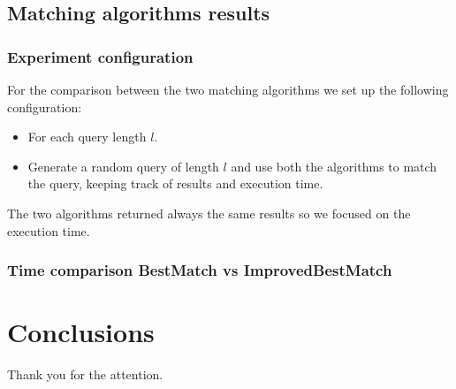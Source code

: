 \documentclass{beamer}
\begin{document}
\subsection{Matching algorithms results}
\begin{frame}
\frametitle{Experiment configuration}
For the comparison between the two matching algorithms we set up the following configuration:
\begin{itemize}
\item For each query length $l$.
\item Generate a random query of length $l$ and use both the algorithms to match the query, keeping track of results and execution time.
\end{itemize}

The two algorithms returned \alert{always} the same results so we focused on the execution time.
\end{frame}

\begin{frame}
	\frametitle{Time comparison BestMatch vs ImprovedBestMatch}
	\begin{center}
	\end{center}
\end{frame}

\section{Conclusions}
\begin{frame}
\centering 
\Huge{Thank you for the attention.}
\end{frame}
\end{document}

